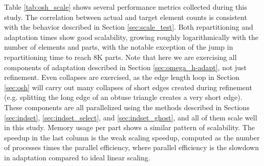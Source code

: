Table \ref{tab:osh_scale} shows several performance metrics collected
during this study.
The correlation between actual and target element counts is consistent
with the behavior described in Section \ref{sec:scale_test}.
Both repartitioning and adaptation times show good scalability,
growing roughly logarithmically with the number of elements and parts,
with the notable exception of the jump in repartitioning time
to reach 8K parts.
Note that here we are exercising all components
of adaptation described in Section \ref{sec:omega_h-adapt}, not just
refinement.
Even collapses are exercised, as the edge length loop in
Section \ref{sec:osh} will carry out many collapses of short
edges created during refinement (e.g. splitting the long edge
of an obtuse triangle creates a very short edge).
These components are all parallelized using the methods described
in Sections \ref{sec:indset}, \ref{sec:indset_select}, and
\ref{sec:indset_ghost}, and all of them scale well in this study.
Memory usage per part shows a similar pattern of scalability.
The speedup in the last column is the weak scaling speedup,
computed as the number of processes times the parallel
efficiency, where parallel efficiency is the slowdown
in adaptation compared to ideal linear scaling.

